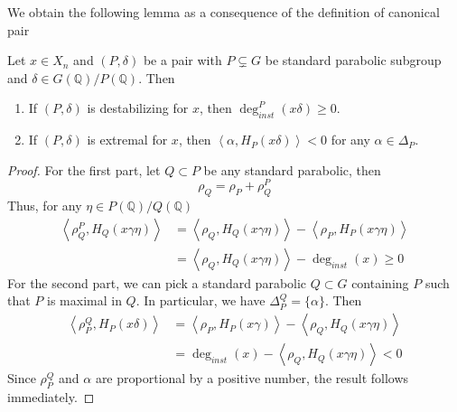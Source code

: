 We obtain the following lemma as a consequence of the definition of canonical pair
\begin{lemma}\label{canonical-pair}\citetext{\citealp[Lemma 2.3.2]{MR3969872}; \citealp[Lemma 4.2.5]{patnaik2025borel}}
    Let $x \in X_n$  and $(P,\delta)$ be a pair with $P \subsetneq G$ be standard parabolic subgroup and
    $\delta \in G(\mathbb{Q})/P(\mathbb{Q})$. Then
    \begin{enumerate}
        \item If $(P,\delta)$ is destabilizing for $x$, then $\deg_{inst}^P(x\delta) \ge 0$. \label{destabilizing}
        \item If $(P,\delta) $ is extremal for $x$, then $\left\langle \alpha, H_P(x\delta)\right\rangle < 0$ for any $\alpha \in \Delta_P$.\label{extremal}
    \end{enumerate}
\end{lemma}
\begin{proof}
    For the first part, let $Q \subset P$ be any standard parabolic, then
    \[\rho_Q = \rho_P + \rho_Q^P\]
    Thus, for any $\eta \in P(\mathbb{Q})/Q(\mathbb{Q})$
    \begin{align*}
        \left\langle \rho_Q^P,H_Q(x\gamma\eta)\right\rangle & = \left\langle\rho_Q,H_Q(x\gamma\eta)\right\rangle - \left\langle\rho_P,H_P(x\gamma\eta)\right\rangle \\                                                 & = \left\langle\rho_Q,H_Q(x\gamma\eta)\right\rangle -\deg_{inst}(x) \ge 0
    \end{align*}
    For the second part, we can pick a standard parabolic $Q \subset G$ containing $P$ such that $P$ is maximal in $Q$. In particular, we have
    $\Delta^{Q}_P = \{\alpha\}$. Then
    \begin{align*}
        \left\langle\rho_P^Q,H_P(x\delta)\right\rangle & = \left\langle\rho_P,H_P(x\gamma)\right\rangle - \left\langle\rho_Q,H_Q(x\gamma\eta)\right\rangle \\
                                                       & = \deg_{inst}(x) - \left\langle\rho_Q,H_Q(x\gamma\eta)\right\rangle <0
    \end{align*}
    Since $\rho_P^Q$ and $\alpha$ are proportional by a positive number, the result follows immediately.\end{proof}
